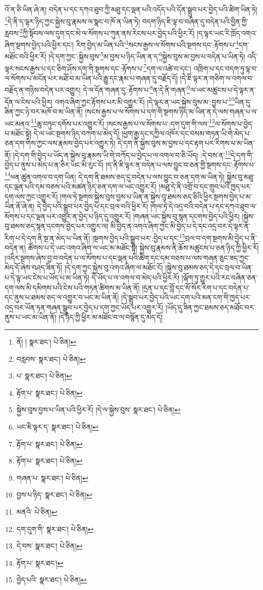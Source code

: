 འོ་ན་ཅི་ཡིན་ཞེ་ན། བདེན་པ་དང་དཀའ་ཐུབ་ཀྱི་མཐུ་དང་ལྡན་པའི་འདོད་པའི་དོན་སྒྲུབ་པར་བྱེད་པའི་ཚིག་ཡིན་ཏེ། \footnote{ནོ། །   སྣར་ཐང་།  པེ་ཅིན། }དེ་ནི་ད་ལྟར་ཉིད་ཀྱང་སྐྱེས་བུ་རྣམས་ལ་སྣང་བ་ཁོ་ན་ཡིན་ཏེ། བདག་ཉིད་ཇི་ལྟ་བ་བཞིན་དུ་བདེན་པའི་བྱིན་གྱི་རླབས་\footnote{བརླབས་  སྣར་ཐང་།  པེ་ཅིན། }ཀྱི་སྟོབས་ལས་དུག་དང་མེ་ལ་སོགས་པ་ཀུན་ནས་རེངས་པར་བྱེད་པའི་ཕྱིར་རོ། །ད་ལྟར་ཡང་རི་ཁྲོད་འགའ་ཞིག་སྔགས་བྱེད་པའི་ཕྱིར་དང་། རིག་བྱེད་མ་ཡིན་པའི་\footnote{པ་  སྣར་ཐང་།  པེ་ཅིན། }སངས་རྒྱས་ལ་སོགས་པའི་སྔགས་དང་:རྟོགས་པ་\footnote{རྟོག་པ་  སྣར་ཐང་།  པེ་ཅིན། }དག་མཐོང་བའི་ཕྱིར་རོ། །དེ་དག་ཀྱང་:སྐྱེས་བུས་\footnote{སྐྱེས་བུས་བྱས་པ་ཡིན་པའི་ཕྱིར་རོ། །དེ་ལ་སྐྱེས་བུས་  སྣར་ཐང་།  པེ་ཅིན། }མ་བྱས་པ་ཉིད་ཡིན་ན་ད་\footnote{ཡང་ཇི་ལྟར་ད་  སྣར་ཐང་།  པེ་ཅིན། }སྐྱེས་བུས་མ་བྱས་པ་བདེན་པ་ཡིན་ཏེ། འདི་ལྟར་སངས་རྒྱས་པ་དང་ཅིག་ཤོས་དག་གི་སྔགས་དང་:རྟོགས་པ་\footnote{རྟོག་པ་  སྣར་ཐང་།  པེ་ཅིན། }དག་ལ་འཚེ་བ་དང་། འཁྲིག་པ་དང་བདག་ཏུ་ལྟ་བ་ལ་སོགས་པ་མངོན་པར་མཐོ་བ་མ་ཡིན་པའི་རྒྱུ་དང་རྣམ་པ་གཞན་དུ་བརྗོད་དོ། །དེ་ཇི་ལྟར་ན་གཅིག་ལ་འགལ་བ་བརྗོད་ན་གཉིས་བདེན་པར་འགྱུར། དེ་ལ་དོན་གཞན་དུ་:རྟོགས་པ་\footnote{རྟོག་པ་  སྣར་ཐང་།  པེ་ཅིན། }ན་དེ་ནི་གཞན་\footnote{གཞན་པ་  སྣར་ཐང་།  པེ་ཅིན། }ལ་ཡང་མཚུངས་པ་དེ་ལྟར་ན་དོན་ལ་ངེས་པའི་ཕྱིར། འགའ་ཞིག་ཀྱང་རྟོགས་པར་མི་འགྱུར་རོ། །དེ་ལྟར་ན་ཡང་སྐྱེས་བུས་མ་:བྱས་པ་\footnote{བྱས་པ་ཉིད་  སྣར་ཐང་།  པེ་ཅིན། }ཡིན་དུ་ཟིན་ཀྱང་ཉེ་བར་མཁོ་བ་མ་ཡིན་ནོ། །སངས་རྒྱས་པ་ལ་སོགས་པ་དག་གི་སྔགས་ཉིད་མ་ཡིན་ན་དེ་ལས་གཞན་པ་ལ་ཡང་མནའ་\footnote{མནའི་  པེ་ཅིན། }ཆུ་བཏུང་དགོས་པར་འགྱུར་རོ། །སངས་རྒྱས་པ་ལ་སོགས་པ་:དག་དུག་གི་ལས་\footnote{དག་དུག་གི་  སྣར་ཐང་།  པེ་ཅིན། }ལ་སོགས་པ་བྱེད་པ་མཐོང་སྟེ། དེ་ལ་ཡང་སྔགས་ཉིད་བཀག་པ་མེད་དོ། །ཕྱག་རྒྱ་དང་དཀྱིལ་འཁོར་དང་བསམ་གཏན་ཡི་གེ་མེད་པ་ཅན་དག་གིས་ཀྱང་ལས་རྣམས་བྱེད་པར་འགྱུར་ཏེ། དེ་དག་ནི་སྐྱེས་བུས་མ་བྱས་པ་དང་རྟག་པར་རིགས་པ་མ་ཡིན་ནོ། །དེ་དག་གི་བྱེད་པ་ཡོད་ན་སྐྱེས་བུ་རྣམས་ཡི་གེ་བཀོད་པ་བྱེད་པ་ལ་འགལ་བ་ཅི་ཡོད། :དེ་བས་ན་\footnote{དེ་བས་  སྣར་ཐང་།  པེ་ཅིན། }དེ་དག་གི་བྱེད་པ་ནུས་པ་མེད་པ་ན་ཅིར་ཡང་མི་རུང་ངོ། །ད་ནི་ཇི་ལྟར་ན་བདེན་པ་ལས་བྱུང་བ་ཅན་གྱི་སྔགས་དང་:རྟོགས་པ་\footnote{རྟོག་པ་  སྣར་ཐང་། }ཕན་ཚུན་འགལ་བ་དག་ཡིན། དེ་དག་ནི་ཐམས་ཅད་དུ་བདེན་པ་ལས་བྱུང་བ་ཅན་དག་མ་ཡིན་ཏེ། སྐྱེས་བུ་མཐུ་དང་ལྡན་པའི་དམ་བཅས་པའི་མཚན་ཉིད་ཅན་དག་ལ་ཡང་འགྱུར་རོ། །མཐུ་དེ་ནི་འགྲོ་བ་དང་གྲུབ་པའི་ཁྱད་པར་དག་ལས་ཀྱང་འགྱུར་རོ། །གལ་ཏེ་སྔགས་སྐྱེས་བུས་བྱས་པ་ཡིན་ན་སྐྱེས་བུ་ཐམས་ཅད་ཅིའི་ཕྱིར་སྔགས་བྱེད་པ་མ་ཡིན་ནོ་ཞེ་ན། དེ་བྱེད་པའི་སྒྲུབ་པར་བྱེད་པ་དང་བྲལ་བའི་ཕྱིར་རོ། །གལ་ཏེ་དེ་འདྲ་བའི་བདེན་པ་དང་དཀའ་ཐུབ་ལ་སོགས་པ་དང་ལྡན་པར་འགྱུར་ན་བྱེད་པ་ཉིད་དུ་འགྱུར་རོ། །གཞན་ཡང་སྐྱེས་བུ་སྙན་དངགས་བྱེད་པའི་ཕྱིར། །སྐྱེས་བུ་ཐམས་ཅད་སྙན་དངགས་བྱེད་པར་འགྱུར་ལ། མི་བྱེད་ན་འགའ་ཞིག་ཀྱང་མི་བྱེད་པ་དེ་དང་འདྲ་བར་དེ་ལྟར་ན་རིག་པ་དེ་དག་ནི་སྔ་ན་མེད་པ་ཡིན་ནོ། །སྔགས་བྱེད་པའི་སྒྲུབ་པར་:བྱེད་པ་དང་\footnote{བྱེད་པའི་  སྣར་ཐང་།  པེ་ཅིན། }བྲལ་བ་དག་སྔགས་མི་བྱེད་པ་ནི་བདེན་ན། ཚོགས་པ་དེ་ཡང་འགའ་ཞིག་ལ་ཡང་མ་མཐོང་སྟེ། སྐྱེས་བུ་རྣམས་ནི་ཆོས་མཚུངས་པ་ཅན་ཉིད་ཀྱི་ཕྱིར་རོ། །འདིར་སྔགས་ཞེས་བྱ་བ་བདེན་པ་ལ་སོགས་པ་དང་ལྡན་པའི་ཚིག་དང་དམ་བཅས་པ་ལས་གཞན་ཅུང་ཟད་ཀྱང་མེད་དོ་ཞེས་བཤད་ཟིན་ཏོ། །དེ་དག་ཀྱང་སྐྱེས་བུ་འགའ་ཞིག་ལ་མཐོང་ངོ། །སྐྱེས་བུ་ཐམས་ཅད་དེ་དང་བྲལ་བ་ཡིན་པ་དེ་ལྟ་ཡང་ངེས་པ་ཡོད་པ་མ་ཡིན་ཏེ། དེ་ཡོད་པ་ལ་འགལ་བ་མེད་པའི་ཕྱིར་རོ། །ལྐོག་ཏུ་གྱུར་པའི་རང་བཞིན་ཅན་དག་ལས་མི་དམིགས་པའི་ངེས་པའི་གཏན་ཚིགས་མ་ཡིན་ནོ། །དྲན་པ་དང་བློ་དང་སོ་སོར་རིག་པ་དང་བདེན་པ་དང་ནུས་པ་ཐམས་ཅད་ལ་འགྱུར་བ་ཡང་མ་ཡིན་ནོ། །དེ་སྒྲུབ་པར་བྱེད་པའི་ཡང་དག་པའི་མན་ངག་གི་ཁྱད་པར་འདྲ་བར་ཡོན་ཏན་གཞན་སྒྲུབ་པར་བྱེད་པ་དག་ཀྱང་ཡོད་པར་འགྱུར་རོ། །ཡོད་དུ་ཟིན་ཀྱང་ཐམས་ཅད་མཐོང་བར་ནུས་པ་ཡང་མ་ཡིན་ནོ། །དེ་ཉིད་ཀྱི་ཕྱིར་མ་མཐོང་བ་ལ་བསྙོན་དུ་མེད་དོ། 